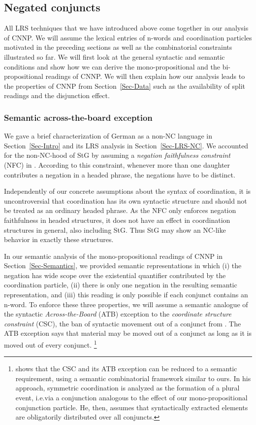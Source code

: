\documentclass[output=paper]{langsci/langscibook}
\begin{document}
\subsection{Negated conjuncts}
\label{Sec-AnalysisCNNP}

All LRS techniques that we have introduced above come together in our analysis of CNNP. 
We will assume the lexical entries of n-words and coordination particles motivated in the preceding sections as well as the combinatorial constraints illustrated so far.
We will first look at the general syntactic and semantic conditions and show how we can derive the mono-propositional and the bi-propositional readings of CNNP. 
We will then explain how our analysis leads to the properties of CNNP from Section~\ref{Sec-Data} such as the availability of split readings and the disjunction effect. 

\subsubsection{Semantic across-the-board exception}
\label{Sec-SemATB}

We gave a brief characterization of German as a non-NC language in Section~\ref{Sec-Intro}
and its LRS analysis in Section~\ref{Sec-LRS-NC}. We accounted for the non-NC-hood of StG by assuming a \emph{negation faithfulness constraint} (NFC) in . According to this constraint, whenever more than one daughter contributes a negation in a headed phrase, the negations have to be distinct.

Independently of our concrete assumptions about the syntax of coordination, it is uncontroversial that coordination has its own syntactic structure and should not be treated as an ordinary headed phrase. 
As the NFC only enforces negation faithfulness in headed structures, it does not have an effect in coordination structures in general, also including StG. Thus StG may show an NC-like behavior in exactly these structures.

In our semantic analysis of the mono-propositional readings of CNNP in Section~\ref{Sec-Semantics}, we provided semantic representations in which (i) the negation has wide scope over the existential quantifier contributed by the coordination particle, (ii) there is only one negation in the resulting semantic representation, and (iii) this reading  is only possible if each conjunct contains an n-word.
%
To enforce these three properties, we will assume a semantic analogue of the syntactic \emph{Across-the-Board} (ATB) exception to the \emph{coordinate structure constraint} (CSC), the ban of syntactic movement out of a conjunct from \citet{Ross:67}. The ATB exception says that material may be moved out of a conjunct as long as it is moved out of every conjunct.%
\footnote{\citet{Chaves:12} shows that the CSC and its ATB exception can be reduced to a semantic requirement, using a semantic combinatorial framework similar to ours. 
In his approach, symmetric coordination is analyzed as the formation of a plural event, i.e.\@ via a conjunction analogous to the effect of our mono-propositional conjunction particle. He, then, assumes that syntactically extracted elements are obligatorily distributed over all conjuncts.}
\end{document}
